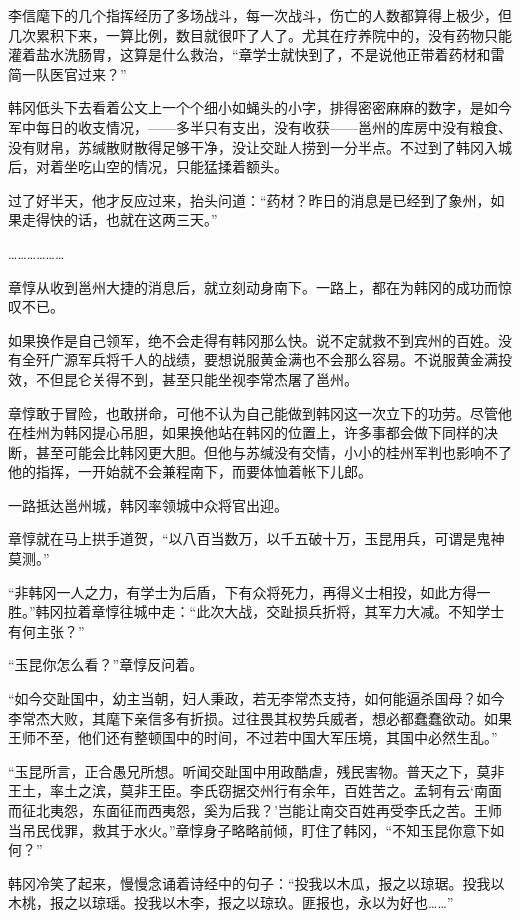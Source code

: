 李信麾下的几个指挥经历了多场战斗，每一次战斗，伤亡的人数都算得上极少，但几次累积下来，一算比例，数目就很吓了人了。尤其在疗养院中的，没有药物只能灌着盐水洗肠胃，这算是什么救治，“章学士就快到了，不是说他正带着药材和雷简一队医官过来？”

韩冈低头下去看着公文上一个个细小如蝇头的小字，排得密密麻麻的数字，是如今军中每日的收支情况，——多半只有支出，没有收获——邕州的库房中没有粮食、没有财帛，苏缄散财散得足够干净，没让交趾人捞到一分半点。不过到了韩冈入城后，对着坐吃山空的情况，只能猛揉着额头。

过了好半天，他才反应过来，抬头问道：“药材？昨日的消息是已经到了象州，如果走得快的话，也就在这两三天。”

………………

章惇从收到邕州大捷的消息后，就立刻动身南下。一路上，都在为韩冈的成功而惊叹不已。

如果换作是自己领军，绝不会走得有韩冈那么快。说不定就救不到宾州的百姓。没有全歼广源军兵将千人的战绩，要想说服黄金满也不会那么容易。不说服黄金满投效，不但昆仑关得不到，甚至只能坐视李常杰屠了邕州。

章惇敢于冒险，也敢拼命，可他不认为自己能做到韩冈这一次立下的功劳。尽管他在桂州为韩冈提心吊胆，如果换他站在韩冈的位置上，许多事都会做下同样的决断，甚至可能会比韩冈更大胆。但他与苏缄没有交情，小小的桂州军判也影响不了他的指挥，一开始就不会兼程南下，而要体恤着帐下儿郎。

一路抵达邕州城，韩冈率领城中众将官出迎。

章惇就在马上拱手道贺，“以八百当数万，以千五破十万，玉昆用兵，可谓是鬼神莫测。”

“非韩冈一人之力，有学士为后盾，下有众将死力，再得义士相投，如此方得一胜。”韩冈拉着章惇往城中走：“此次大战，交趾损兵折将，其军力大减。不知学士有何主张？”

“玉昆你怎么看？”章惇反问着。

“如今交趾国中，幼主当朝，妇人秉政，若无李常杰支持，如何能逼杀国母？如今李常杰大败，其麾下亲信多有折损。过往畏其权势兵威者，想必都蠢蠢欲动。如果王师不至，他们还有整顿国中的时间，不过若中国大军压境，其国中必然生乱。”

“玉昆所言，正合愚兄所想。听闻交趾国中用政酷虐，残民害物。普天之下，莫非王土，率土之滨，莫非王臣。李氏窃据交州行有余年，百姓苦之。孟轲有云‘南面而征北夷怨，东面征而西夷怨，奚为后我？’岂能让南交百姓再受李氏之苦。王师当吊民伐罪，救其于水火。”章惇身子略略前倾，盯住了韩冈，“不知玉昆你意下如何？”

韩冈冷笑了起来，慢慢念诵着诗经中的句子：“投我以木瓜，报之以琼琚。投我以木桃，报之以琼瑶。投我以木李，报之以琼玖。匪报也，永以为好也……”

